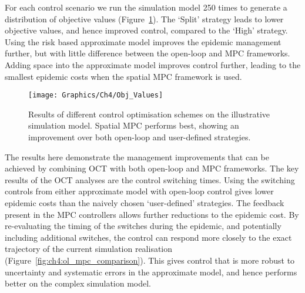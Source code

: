 For each control scenario we run the simulation model 250 times to generate a distribution of objective values (Figure~\ref{fig:ch4:obj_values}). The `Split' strategy leads to lower objective values, and hence improved control, compared to the `High' strategy. Using the risk based approximate model improves the epidemic management further, but with little difference between the open-loop and MPC frameworks. Adding space into the approximate model improves control further, leading to the smallest epidemic costs when the spatial MPC framework is used.

\begin{figure}[h]
    \begin{center}
        \texttt{[image: Graphics/Ch4/Obj\_Values]}
        \caption[Comparing control strategy performance on the network model]{Results of different control optimisation schemes on the illustrative simulation model. Spatial MPC performs best, showing an improvement over both open-loop and user-defined strategies.}
        \label{fig:ch4:obj_values}
    \end{center}
\end{figure}

The results here demonstrate the management improvements that can be achieved by combining OCT with both open-loop and MPC frameworks. The key results of the OCT analyses are the control switching times. Using the switching controls from either approximate model with open-loop control gives lower epidemic costs than the naively chosen `user-defined' strategies. The feedback present in the MPC controllers allows further reductions to the epidemic cost. By re-evaluating the timing of the switches during the epidemic, and potentially including additional switches, the control can respond more closely to the exact trajectory of the current simulation realisation (Figure~\ref{fig:ch4:ol_mpc_comparison}). This gives control that is more robust to uncertainty and systematic errors in the approximate model, and hence performs better on the complex simulation model.

